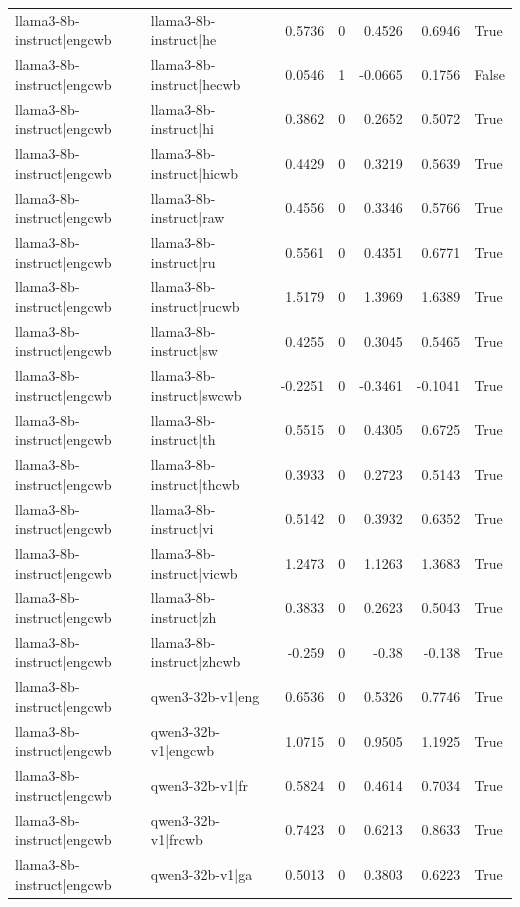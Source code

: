 \begin{table}
\begin{tabular}{l l r r r r l}
llama3-8b-instruct|engcwb & llama3-8b-instruct|he & 0.5736 & 0 & 0.4526 & 0.6946 & True \\
llama3-8b-instruct|engcwb & llama3-8b-instruct|hecwb & 0.0546 & 1 & -0.0665 & 0.1756 & False \\
llama3-8b-instruct|engcwb & llama3-8b-instruct|hi & 0.3862 & 0 & 0.2652 & 0.5072 & True \\
llama3-8b-instruct|engcwb & llama3-8b-instruct|hicwb & 0.4429 & 0 & 0.3219 & 0.5639 & True \\
llama3-8b-instruct|engcwb & llama3-8b-instruct|raw & 0.4556 & 0 & 0.3346 & 0.5766 & True \\
llama3-8b-instruct|engcwb & llama3-8b-instruct|ru & 0.5561 & 0 & 0.4351 & 0.6771 & True \\
llama3-8b-instruct|engcwb & llama3-8b-instruct|rucwb & 1.5179 & 0 & 1.3969 & 1.6389 & True \\
llama3-8b-instruct|engcwb & llama3-8b-instruct|sw & 0.4255 & 0 & 0.3045 & 0.5465 & True \\
llama3-8b-instruct|engcwb & llama3-8b-instruct|swcwb & -0.2251 & 0 & -0.3461 & -0.1041 & True \\
llama3-8b-instruct|engcwb & llama3-8b-instruct|th & 0.5515 & 0 & 0.4305 & 0.6725 & True \\
llama3-8b-instruct|engcwb & llama3-8b-instruct|thcwb & 0.3933 & 0 & 0.2723 & 0.5143 & True \\
llama3-8b-instruct|engcwb & llama3-8b-instruct|vi & 0.5142 & 0 & 0.3932 & 0.6352 & True \\
llama3-8b-instruct|engcwb & llama3-8b-instruct|vicwb & 1.2473 & 0 & 1.1263 & 1.3683 & True \\
llama3-8b-instruct|engcwb & llama3-8b-instruct|zh & 0.3833 & 0 & 0.2623 & 0.5043 & True \\
llama3-8b-instruct|engcwb & llama3-8b-instruct|zhcwb & -0.259 & 0 & -0.38 & -0.138 & True \\
llama3-8b-instruct|engcwb & qwen3-32b-v1|eng & 0.6536 & 0 & 0.5326 & 0.7746 & True \\
llama3-8b-instruct|engcwb & qwen3-32b-v1|engcwb & 1.0715 & 0 & 0.9505 & 1.1925 & True \\
llama3-8b-instruct|engcwb & qwen3-32b-v1|fr & 0.5824 & 0 & 0.4614 & 0.7034 & True \\
llama3-8b-instruct|engcwb & qwen3-32b-v1|frcwb & 0.7423 & 0 & 0.6213 & 0.8633 & True \\
llama3-8b-instruct|engcwb & qwen3-32b-v1|ga & 0.5013 & 0 & 0.3803 & 0.6223 & True \\

\end{tabular}
\end{table}
